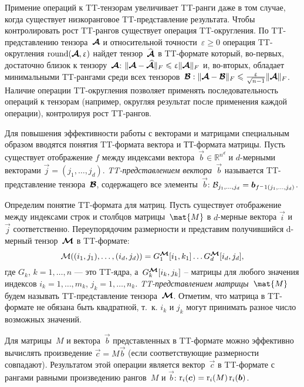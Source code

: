 Примение операций к TT\hyp{}тензорам увеличивает TT\hyp{}ранги даже в том случае, когда существует низкоранговое TT\hyp{}представление результата. Чтобы контролировать рост TT\hyp{}рангов существует операция TT\hyp{}округления.
По TT\hyp{}представлению тензора~$\boldsymbol{\mathcal{A}}$ и относительной точности~$\varepsilon \geq 0$ операция TT\hyp{}округления $\operatorname{round}(\boldsymbol{\mathcal{A}},\upvarepsilon)$ найдет тензор~$\widehat{\boldsymbol{\mathcal{A}}}$ в TT\hyp{}формате который, во-первых, достаточно близок к тензору~$\boldsymbol{\mathcal{A}}$: $\| \boldsymbol{\mathcal{A}} - \boldsymbol{\mathcal{\widehat{A}}} \|_F \leqslant \upvarepsilon  \| \boldsymbol{\mathcal{A}}  \|_F$ и, во-вторых, обладает минимальными TT\hyp{}рангами среди всех тензоров~$\boldsymbol{\mathcal{B}}: \| \boldsymbol{\mathcal{A}} - \boldsymbol{\mathcal{B}} \|_F \leqslant \frac{\upvarepsilon}{\sqrt{n - 1}}  \| \boldsymbol{\mathcal{A}}  \|_F$. Наличие операции TT\hyp{}округления позволяет применять последовательность операций к тензорам (например, округляя результат после применения каждой операции), контролируя рост TT\hyp{}рангов.


Для повышения эффективности работы с векторами и матрицами специальным образом вводятся понятия TT\hyp{}формата вектора и ТТ\hyp{}формата матрицы.
Пусть существует отображение $f$ между индексами вектора~$\vec{b}\in\mathbb{R}^{n^d}$ и $d$-мерными векторами $\vec{j} = (j_1, \dots, j_d)$.%
\emph{TT\hyp{}представлением вектора~$\vec{b}$} называется TT\hyp{}представление тензора~$\boldsymbol{\mathcal{B}}$, содержащего все элементы~$\vec{b}$: $\mathcal{B}_{j_1, \dots, j_d} = \boldsymbol{b}_{f^-1(j_1, \dots, j_d)}$.


Определим понятие TT\hyp{}формата для матриц. Пусть существует отображение между индексами строк и столбцов матрицы~$\mat{M}$ в $d$-мерные вектора $\vec{i}$ и $\vec{j}$ соответственно. Переупорядочим размерности и представим получившийся d-мерный тензор~$\boldsymbol{\mathcal{M}}$ в TT\hyp{}формате:
\begin{equation*}
\mathcal{M}((i_1, j_1),\ldots,(i_d,j_d))=G_1^{\boldsymbol{\mathcal{M}}}[i_1,k_1]\dots G_d^{\boldsymbol{\mathcal{M}}}[i_d, j_d],
\end{equation*}
где $G_k$, $k = 1,\dots,n$ --- это TT\hyp{}ядра, а~$G_k^{\boldsymbol{\mathcal{M}}}[i_k,j_k]$ -- матрицы для любого значения индексов $i_k = 1, \ldots, m_k$, $j_k = 1, \ldots, n_k$. \emph{TT\hyp{}представлением матрицы~$\mat{M}$} будем называть TT\hyp{}представление тензора~$\boldsymbol{\mathcal{M}}$. Отметим, что матрица в TT\hyp{}формате не обязана быть квадратной, т.~к. $i_k$ и $j_k$ могут принимать разное число возможных значений.


Для матрицы~$M$ и вектора~$\vec{b}$ представленных в TT\hyp{}формате можно эффективно вычислять произведение $\vec{c}=M\vec{b}$ (если соответствующие размерности совпадают). Результатом этой операции является вектор~$\vec{c}$ в TT\hyp{}формате с рангами равными произведению рангов~$M$ и $\vec{b}$: $\operatorname{r}_i(\boldsymbol{c}) = \operatorname{r}_i(M) \operatorname{r}_i(\boldsymbol{b})$.

